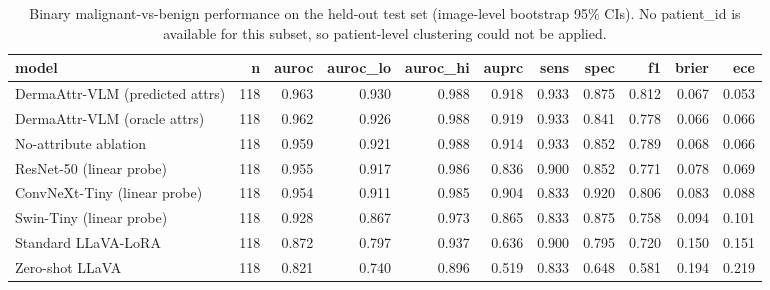 \begin{table}
\caption{Binary malignant-vs-benign performance on the held-out test set (image-level bootstrap 95\% CIs). No patient_id is available for this subset, so patient-level clustering could not be applied.}
\label{tab:classification_real}
\begin{tabular}{lrrrrrrrrrr}
\toprule
model & n & auroc & auroc_lo & auroc_hi & auprc & sens & spec & f1 & brier & ece \\
\midrule
DermaAttr-VLM (predicted attrs) & 118 & 0.963 & 0.930 & 0.988 & 0.918 & 0.933 & 0.875 & 0.812 & 0.067 & 0.053 \\
DermaAttr-VLM (oracle attrs) & 118 & 0.962 & 0.926 & 0.988 & 0.919 & 0.933 & 0.841 & 0.778 & 0.066 & 0.066 \\
No-attribute ablation & 118 & 0.959 & 0.921 & 0.988 & 0.914 & 0.933 & 0.852 & 0.789 & 0.068 & 0.066 \\
ResNet-50 (linear probe) & 118 & 0.955 & 0.917 & 0.986 & 0.836 & 0.900 & 0.852 & 0.771 & 0.078 & 0.069 \\
ConvNeXt-Tiny (linear probe) & 118 & 0.954 & 0.911 & 0.985 & 0.904 & 0.833 & 0.920 & 0.806 & 0.083 & 0.088 \\
Swin-Tiny (linear probe) & 118 & 0.928 & 0.867 & 0.973 & 0.865 & 0.833 & 0.875 & 0.758 & 0.094 & 0.101 \\
Standard LLaVA-LoRA & 118 & 0.872 & 0.797 & 0.937 & 0.636 & 0.900 & 0.795 & 0.720 & 0.150 & 0.151 \\
Zero-shot LLaVA & 118 & 0.821 & 0.740 & 0.896 & 0.519 & 0.833 & 0.648 & 0.581 & 0.194 & 0.219 \\
\bottomrule
\end{tabular}
\end{table}
